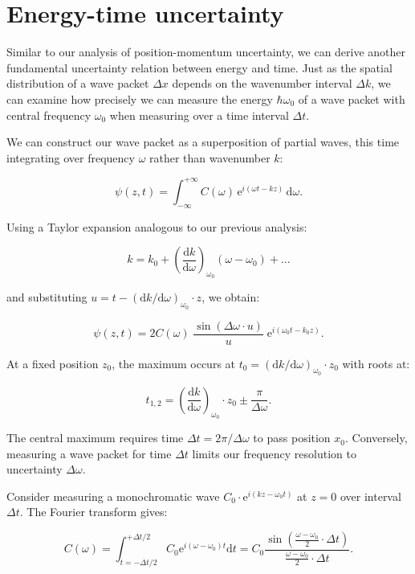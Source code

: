 \documentclass[
  a4paper,
]{book}
\begin{document}
\section{Energy-time uncertainty}\label{energy-time-uncertainty}

Similar to our analysis of position-momentum uncertainty, we can derive
another fundamental uncertainty relation between energy and time. Just
as the spatial distribution of a wave packet \(\Delta x\) depends on the
wavenumber interval \(\Delta k\), we can examine how precisely we can
measure the energy \(\hbar \omega_0\) of a wave packet with central
frequency \(\omega_0\) when measuring over a time interval \(\Delta t\).

We can construct our wave packet as a superposition of partial waves,
this time integrating over frequency \(\omega\) rather than wavenumber
\(k\):

\[
\psi \left( z,t \right) = \int_{-\infty}^{+\infty} C \left( \omega \right) \, \mathrm{e}^{i\left(\omega t - k z \right)} \, \mathrm{d} \omega \mathrm{.}
\]

Using a Taylor expansion analogous to our previous analysis:

\[
k = k_0 + \left( \frac{\mathrm{d}k}{\mathrm{d} \omega} \right)_{\omega_0} \left( \omega - \omega_0 \right) + \ldots
\]

and substituting
\(u = t - \left( \mathrm{d}k / \mathrm{d} \omega \right)_{\omega_0} \cdot z\),
we obtain:

\[
\psi \left( z,t \right) =2 C \left( \omega \right) \; \frac{\sin \left( \Delta \omega \cdot u \right)}{u} \; \mathrm{e}^{i\left(\omega_0 t - k_0 z \right)} \mathrm{.}
\]

At a fixed position \(z_0\), the maximum occurs at
\(t_0 = \left( \mathrm{d}k / \mathrm{d} \omega \right)_{\omega_0} \cdot z_0\)
with roots at:

\[
t_{1,2} = \left( \frac{\mathrm{d}k}{\mathrm{d} \omega} \right)_{\omega_0} \cdot z_0 \pm \frac{\pi}{\Delta \omega} \mathrm{.}
\]

The central maximum requires time \(\Delta t = 2 \pi / \Delta \omega\)
to pass position \(x_0\). Conversely, measuring a wave packet for time
\(\Delta t\) limits our frequency resolution to uncertainty
\(\Delta \omega\).

Consider measuring a monochromatic wave
\(C_0 \cdot \mathrm{e}^{i\left(k z -\omega_0 t \right)}\) at \(z = 0\)
over interval \(\Delta t\). The Fourier transform gives:

\[
C \left( \omega \right) = \int_{t=-\Delta t/2}^{+\Delta t/2} C_0 \mathrm{e}^{i\left(\omega - \omega_0 \right)t} \mathrm{d}t = C_0 \frac{\sin\left(\frac{\omega - \omega_0}{2} \cdot \Delta t\right)}{\frac{\omega - \omega_0}{2} \cdot \Delta t} \mathrm{.}
\]
\end{document}
